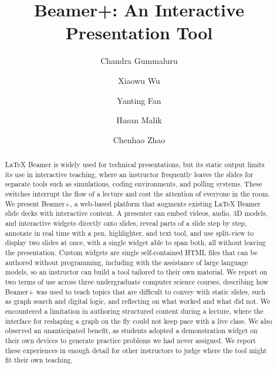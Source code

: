 \documentclass[sigconf]{acmart}
\begin{document}
\title{Beamer+: An Interactive Presentation Tool}

\author{Chandra Gummaluru}

\author{Xiaowu Wu}

\author{Yanting Fan}

\author{Hasan Malik}

\author{Chenhao Zhao}

\renewcommand{\shortauthors}{Gummaluru et al.}

\begin{abstract}
\LaTeX{} Beamer is widely used for technical presentations, but its static output limits its use in interactive teaching, where an instructor frequently leaves the slides for separate tools such as simulations, coding environments, and polling systems. These switches interrupt the flow of a lecture and cost the attention of everyone in the room. We present Beamer+, a web-based platform that augments existing \LaTeX{} Beamer slide decks with interactive content. A presenter can embed videos, audio, 3D models, and interactive widgets directly onto slides, reveal parts of a slide step by step, annotate in real time with a pen, highlighter, and text tool, and use split-view to display two slides at once, with a single widget able to span both, all without leaving the presentation. Custom widgets are single self-contained HTML files that can be authored without programming, including with the assistance of large language models, so an instructor can build a tool tailored to their own material. We report on two terms of use across three undergraduate computer science courses, describing how Beamer+ was used to teach topics that are difficult to convey with static slides, such as graph search and digital logic, and reflecting on what worked and what did not. We encountered a limitation in authoring structured content during a lecture, where the interface for reshaping a graph on the fly could not keep pace with a live class. We also observed an unanticipated benefit, as students adopted a demonstration widget on their own devices to generate practice problems we had never assigned. We report these experiences in enough detail for other instructors to judge where the tool might fit their own teaching.
\end{abstract}
\end{document}
